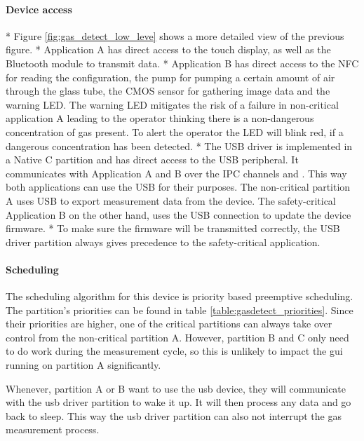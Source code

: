 \paragraph{Device access}
* Figure \ref{fig:gas_detect_low_leve} shows a more detailed view of the previous figure.
* Application A has direct access to the touch display, as well as the Bluetooth module to transmit data.
* Application B has direct access to the NFC for reading the configuration, the pump for pumping a certain amount of air through the glass tube, the CMOS sensor for gathering image data and the warning LED. The warning LED mitigates the risk of a failure in non-critical application A leading to the operator thinking there is a non-dangerous concentration of gas present. To alert the operator the LED will blink red, if a dangerous concentration has been detected.
* The USB driver is implemented in a Native C partition and has direct access to the USB peripheral. It communicates with Application A and B over the IPC channels \aTousb{} and \bTousb{}. This way both applications can use the USB for their purposes. The non-critical partition A uses USB to export measurement data from the device. The safety-critical Application B on the other hand, uses the USB connection to update the device firmware. 
* To make sure the firmware will be transmitted correctly, the USB driver partition always gives precedence to the safety-critical application.
\paragraph{Scheduling}
The scheduling algorithm for this device is priority based preemptive scheduling. The partition's priorities can be found in table \ref{table:gasdetect_priorities}. Since their priorities are higher, one of the critical partitions can always take over control from the non-critical partition A. However, partition B and C only need to do work during the measurement cycle, so this is unlikely to impact the \acrshort{gui} running on partition A significantly. 

Whenever, partition A or B want to use the \acrshort{usb} device, they will communicate with the \acrshort{usb} driver partition to wake it up. It will then process any data and go back to sleep. This way the \acrshort{usb} driver partition can also not interrupt the gas measurement process.

